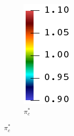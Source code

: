 \begin{figure}[!htbp]
\begin{subfigure}[b]{0.25\textwidth}
    \end{subfigure}
    \begin{subfigure}[b]{0.05\textwidth}
        \caption*{$\pi_c^*$}
        \includegraphics[width=\textwidth]{colorbar/rainbow_vertical.png}
    \end{subfigure}
\end{figure}
